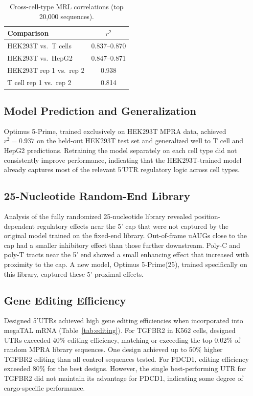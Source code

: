 \documentclass[12pt]{article}
\begin{document}
\begin{table}[ht]
\centering
\caption{Cross-cell-type MRL correlations (top 20,000 sequences).}
\label{tab:correlations}
\begin{tabular}{lc}
\toprule
Comparison & $r^2$ \\
\midrule
HEK293T vs.\ T cells & 0.837--0.870 \\
HEK293T vs.\ HepG2 & 0.847--0.871 \\
HEK293T rep 1 vs.\ rep 2 & 0.938 \\
T cell rep 1 vs.\ rep 2 & 0.814 \\
\bottomrule
\end{tabular}
\end{table}

\subsection{Model Prediction and Generalization}

Optimus 5-Prime, trained exclusively on HEK293T MPRA data, achieved $r^2 = 0.937$ on the held-out HEK293T test set and generalized well to T cell and HepG2 predictions. Retraining the model separately on each cell type did not consistently improve performance, indicating that the HEK293T-trained model already captures most of the relevant 5'UTR regulatory logic across cell types.

\subsection{25-Nucleotide Random-End Library}

Analysis of the fully randomized 25-nucleotide library revealed position-dependent regulatory effects near the 5' cap that were not captured by the original model trained on the fixed-end library. Out-of-frame uAUGs close to the cap had a smaller inhibitory effect than those further downstream. Poly-C and poly-T tracts near the 5' end showed a small enhancing effect that increased with proximity to the cap. A new model, Optimus 5-Prime(25), trained specifically on this library, captured these 5'-proximal effects.

\subsection{Gene Editing Efficiency}

Designed 5'UTRs achieved high gene editing efficiencies when incorporated into megaTAL mRNA (Table~\ref{tab:editing}). For TGFBR2 in K562 cells, designed UTRs exceeded 40\% editing efficiency, matching or exceeding the top 0.02\% of random MPRA library sequences. One design achieved up to 50\% higher TGFBR2 editing than all control sequences tested. For PDCD1, editing efficiency exceeded 80\% for the best designs. However, the single best-performing UTR for TGFBR2 did not maintain its advantage for PDCD1, indicating some degree of cargo-specific performance.
\end{document}
